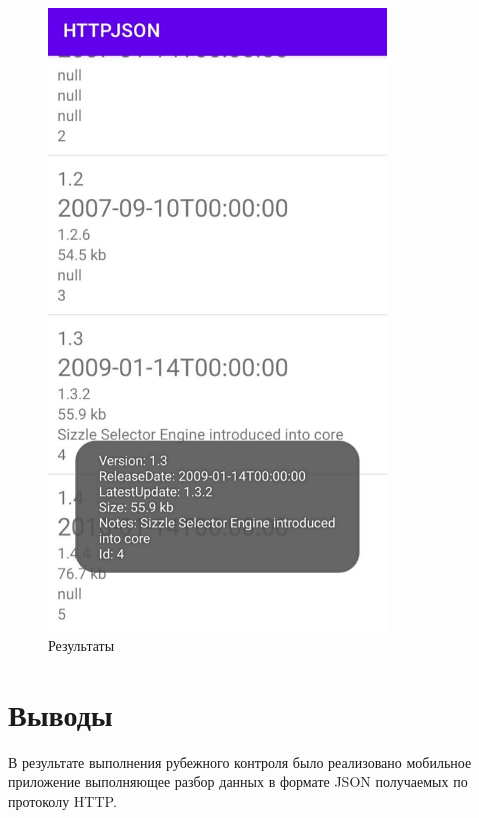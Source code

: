 \documentclass[a4paper, 14pt]{extarticle}
\begin{document}
\begin{figure}[!htb]
	\centering
	\includegraphics[width=0.8\textwidth]{img3}
\caption{Результаты}
\label{fig:img3}
\end{figure}

\section{Выводы}\label{Sect::conclusion}

В результате выполнения рубежного контроля было реализовано мобильное приложение выполняющее разбор данных в формате JSON получаемых по протоколу HTTP.
\end{document}
